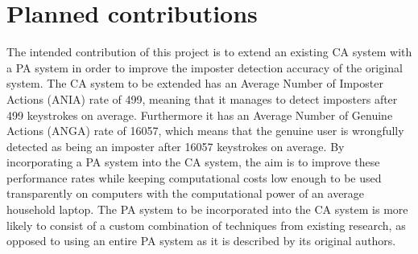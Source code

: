 \documentclass[informationsecurity]{gucmasterproject}
\begin{document}
\section{Planned contributions}
The intended contribution of this project is to extend an existing CA system with a PA system in order to improve the imposter detection accuracy of the original system.
The CA system to be extended \cite{mondal} has an Average Number of Imposter Actions (ANIA) rate of 499, meaning that it manages to detect imposters after 499 keystrokes on average. 
Furthermore it has an Average Number of Genuine Actions (ANGA) rate of 16057, which means that the genuine user is wrongfully detected as being an imposter after 16057 keystrokes on average.
By incorporating a PA system into the CA system, the aim is to improve these performance rates while keeping computational costs low enough to be used transparently on computers with the computational power of an average household laptop.
The PA system to be incorporated into the CA system is more likely to consist of a custom combination of techniques from existing research, as opposed to using an entire PA system as it is described by its original authors.
%
\end{document}
